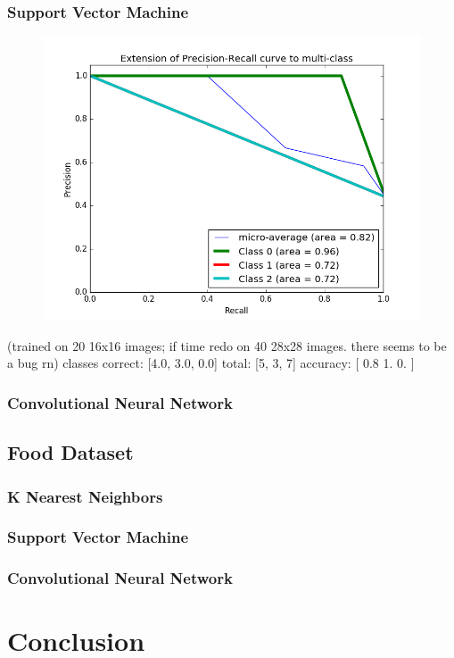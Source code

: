 \documentclass[leqno]{article}
\begin{document}
\subsubsection{Support Vector Machine}
\begin{figure}[h!]
  \centering
  \includegraphics[width=15cm]{svm_pr_hand.png}
\end{figure}
(trained on 20 16x16 images; if time redo on 40 28x28 images. there seems to be
a bug rn)
classes correct:  [4.0, 3.0, 0.0]
total:  [5, 3, 7]
accuracy:  [ 0.8  1.   0. ]

\subsubsection{Convolutional Neural Network}

\subsection{Food Dataset}
\subsubsection{K Nearest Neighbors}
\subsubsection{Support Vector Machine}
\subsubsection{Convolutional Neural Network}

\section{Conclusion}
\end{document}
